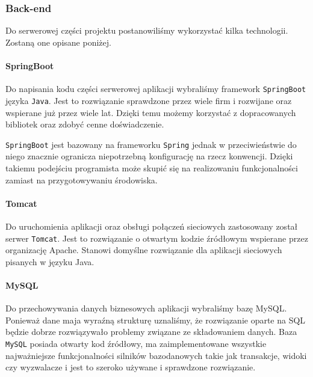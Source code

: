 \documentclass[10pt, titlepage, oneside, a4paper]{article}
\begin{document}
	\subsubsection{Back-end}	
	Do serwerowej części projektu postanowiliśmy wykorzystać kilka technologii. Zostaną one opisane poniżej.
	
	\paragraph{SpringBoot} \mbox{} \par
	Do napisania kodu części serwerowej aplikacji wybraliśmy framework \texttt{SpringBoot} języka \texttt{Java}.
	Jest to rozwiązanie sprawdzone przez wiele firm i rozwijane oraz wspierane już przez wiele lat. Dzięki temu możemy korzystać z dopracowanych bibliotek oraz zdobyć cenne doświadczenie.

	\texttt{SpringBoot} jest bazowany na frameworku \texttt{Spring} jednak w przeciwieństwie do niego znacznie ogranicza niepotrzebną konfigurację na rzecz konwencji.
	Dzięki takiemu podejściu programista może skupić się na realizowaniu funkcjonalności zamiast na przygotowywaniu środowiska.

	\paragraph{Tomcat} \mbox{} \par
	Do uruchomienia aplikacji oraz obsługi połączeń sieciowych zastosowany został serwer \texttt{Tomcat}.
	Jest to rozwiązanie o otwartym kodzie źródłowym wspierane przez organizację Apache.
	Stanowi domyślne rozwiązanie dla aplikacji sieciowych pisanych w języku Java.

	\paragraph{MySQL} \mbox{} \par
	Do przechowywania danych biznesowych aplikacji wybraliśmy bazę MySQL.
	Ponieważ dane maja wyraźną strukturę uznaliśmy, że rozwiązanie oparte na SQL będzie dobrze rozwiązywało problemy związane ze składowaniem danych.
	Baza \texttt{MySQL} posiada otwarty kod źródłowy, ma zaimplementowane wszystkie najważniejsze funkcjonalności silników bazodanowych takie jak transakcje, widoki czy wyzwalacze i jest to szeroko używane i sprawdzone rozwiązanie.
\end{document}
